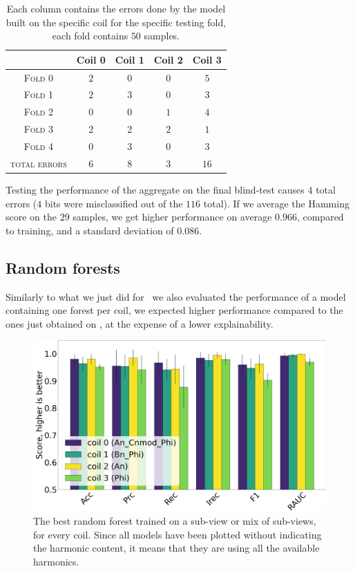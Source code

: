 \begin{table}[!ht]
	\caption{Each column contains the errors done by the model built on the specific coil for
	the specific testing fold, each fold contains $50$ samples.}\label{tbl:dt-errors}

	\bigskip
	\setlength{\tabcolsep}{6pt}
	\centering
	\begin{tabular}{ccccc}
		\toprule
		\textbf{}                     & \textbf{Coil 0}    & \textbf{Coil 1} & \textbf{Coil 2} & \textbf{Coil 3}
		\\
		\midrule
		\textsc{Fold 0}         & $2$           & $0$           & $0$            & $5$            \\
		\textsc{Fold 1}         & $2$		& $3$		& $0$            & $3$		  \\
		\textsc{Fold 2}		& $0$           & $0$		& $1$            & $4$            \\
		\textsc{Fold 3}         & $2$           & $2$ 		& $2$            & $1$            \\
		\textsc{Fold 4}         & $0$		& $3$           & $0$            & $3$            \\
		\midrule
		\textsc{total errors}	& $6$		& $8$		& $3$		& $16$
		\\
		\bottomrule
	\end{tabular}
\end{table}

Testing the performance of the aggregate on the final blind-test causes $4$ total errors ($4$ bits
were misclassified out of the $116$ total). If we average the Hamming score on the $29$ samples, we get higher
performance on average $0.966$, compared to training, and a standard deviation of $0.086$.

\subsection{Random forests}
Similarly to what we just did for \dts\ we also evaluated the performance of a model containing one forest per coil, we expected higher performance compared to the ones just obtained on \dts, at the expense of a lower explainability.

\begin{figure}[!ht]
	\centering
	\includegraphics[width=0.7\linewidth]{img/best_rfs_qlp.png}
	\caption{The best random forest trained on a sub-view or mix of sub-views, for every coil.
		Since all models have been plotted without indicating the harmonic content, it means
		that they are using all the available harmonics.}\label{fig:brfs-qlp}
\end{figure}

